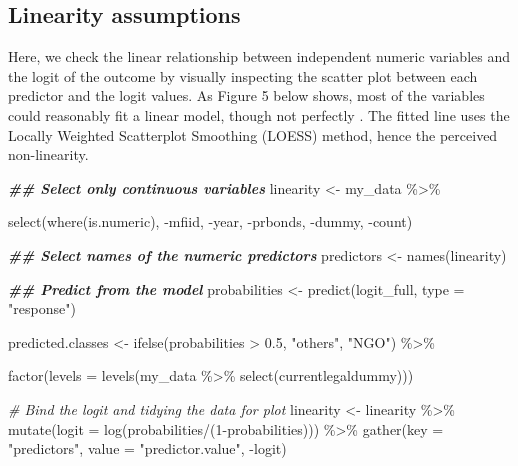 \documentclass[a4paper,nobind]{templates/ociamthesis}
\newenvironment{Shaded}{\begin{snugshade}}{\end{snugshade}}
\newcommand{\AttributeTok}[1]{\textcolor[rgb]{0.77,0.63,0.00}{#1}}
\newcommand{\CommentTok}[1]{\textcolor[rgb]{0.56,0.35,0.01}{\textit{#1}}}
\newcommand{\DecValTok}[1]{\textcolor[rgb]{0.00,0.00,0.81}{#1}}
\newcommand{\DocumentationTok}[1]{\textcolor[rgb]{0.56,0.35,0.01}{\textbf{\textit{#1}}}}
\newcommand{\FloatTok}[1]{\textcolor[rgb]{0.00,0.00,0.81}{#1}}
\newcommand{\FunctionTok}[1]{\textcolor[rgb]{0.00,0.00,0.00}{#1}}
\newcommand{\NormalTok}[1]{#1}
\newcommand{\OtherTok}[1]{\textcolor[rgb]{0.56,0.35,0.01}{#1}}
\newcommand{\SpecialCharTok}[1]{\textcolor[rgb]{0.00,0.00,0.00}{#1}}
\newcommand{\StringTok}[1]{\textcolor[rgb]{0.31,0.60,0.02}{#1}}
\renewenvironment{Shaded}
{
  \vspace{10pt}%
  \begin{snugshade}%
}{%
  \end{snugshade}%
  \vspace{8pt}%
}
\begin{document}
\hypertarget{linearity-assumptions}{%
\subsection{Linearity assumptions}\label{linearity-assumptions}}

Here, we check the linear relationship between independent numeric variables and the logit of the outcome by visually inspecting the scatter plot between each predictor and the logit values. As Figure 5 below shows, most of the variables could reasonably fit a linear model, though not perfectly \autocite{cheng2007testing}. The fitted line uses the Locally Weighted Scatterplot Smoothing (LOESS) method, hence the perceived non-linearity.

\begin{landscape}

\begin{Shaded}
\begin{Highlighting}[]
\DocumentationTok{\#\# Select only continuous variables}
\NormalTok{linearity }\OtherTok{\textless{}{-}}\NormalTok{ my\_data }\SpecialCharTok{\%\textgreater{}\%} 
  
  \FunctionTok{select}\NormalTok{(}\FunctionTok{where}\NormalTok{(is.numeric), }\SpecialCharTok{{-}}\NormalTok{mfiid, }\SpecialCharTok{{-}}\NormalTok{year, }\SpecialCharTok{{-}}\NormalTok{prbonds, }\SpecialCharTok{{-}}\NormalTok{dummy, }\SpecialCharTok{{-}}\NormalTok{count)}

\DocumentationTok{\#\# Select names of the numeric predictors}
\NormalTok{predictors }\OtherTok{\textless{}{-}} \FunctionTok{names}\NormalTok{(linearity)}

\DocumentationTok{\#\# Predict from the model}
\NormalTok{probabilities }\OtherTok{\textless{}{-}} \FunctionTok{predict}\NormalTok{(logit\_full, }\AttributeTok{type =} \StringTok{"response"}\NormalTok{)}

\NormalTok{predicted.classes }\OtherTok{\textless{}{-}} \FunctionTok{ifelse}\NormalTok{(probabilities }\SpecialCharTok{\textgreater{}} \FloatTok{0.5}\NormalTok{, }\StringTok{"others"}\NormalTok{, }\StringTok{"NGO"}\NormalTok{) }\SpecialCharTok{\%\textgreater{}\%} 
  
  \FunctionTok{factor}\NormalTok{(}\AttributeTok{levels =} \FunctionTok{levels}\NormalTok{(my\_data }\SpecialCharTok{\%\textgreater{}\%} \FunctionTok{select}\NormalTok{(currentlegaldummy)))}

\CommentTok{\# Bind the logit and tidying the data for plot}
\NormalTok{linearity }\OtherTok{\textless{}{-}}\NormalTok{ linearity }\SpecialCharTok{\%\textgreater{}\%}
  \FunctionTok{mutate}\NormalTok{(}\AttributeTok{logit =} \FunctionTok{log}\NormalTok{(probabilities}\SpecialCharTok{/}\NormalTok{(}\DecValTok{1}\SpecialCharTok{{-}}\NormalTok{probabilities))) }\SpecialCharTok{\%\textgreater{}\%}
  \FunctionTok{gather}\NormalTok{(}\AttributeTok{key =} \StringTok{"predictors"}\NormalTok{, }\AttributeTok{value =} \StringTok{"predictor.value"}\NormalTok{, }\SpecialCharTok{{-}}\NormalTok{logit)}


\end{Highlighting}
\end{Shaded}
\end{landscape}
\end{document}
